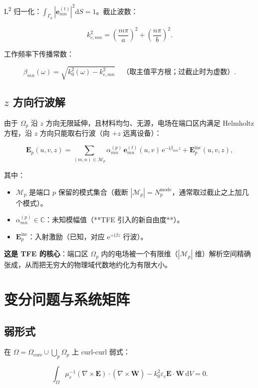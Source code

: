 \documentclass[11pt,a4paper]{ctexart}
\newcommand{\C}{\mathbb{C}}
\newcommand{\im}{\mathrm{i}}
\begin{document}
L\textsuperscript{2} 归一化：$\int_{\Gamma_p} |\bm e_{mn}^{(t)}|^2 \mathrm{d}S = 1$。截止波数：

\[
  k_{c, mn}^2 = \left(\frac{m\pi}{a}\right)^2 + \left(\frac{n\pi}{b}\right)^2.
\]

工作频率下传播常数：

\[
  \beta_{mn}(\omega) = \sqrt{k_0^2(\omega) - k_{c, mn}^2}
  \quad \text{（取主值平方根；过截止时为虚数）}.
\]

\subsection{\texorpdfstring{$z$ 方向行波解}{z 方向行波解}}

由于 $\Omega_p$ 沿 $z$ 方向无限延伸，且材料均匀、无源，电场在端口区内满足 Helmholtz 方程，沿 $z$ 方向只能取右行波（向 $+z$ 远离设备）：

\[
  \bm E_p(u, v, z) = \sum_{(m,n) \in \mathcal M_p}
    \alpha_{mn}^{(p)}\,\bm e_{mn}^{(t)}(u, v)\,\mathrm{e}^{-\im\beta_{mn} z}
    + \bm E_p^{\text{inc}}(u, v, z),
\]

其中：

\begin{itemize}
\item $\mathcal M_p$ 是端口 $p$ 保留的模式集合（截断 $|\mathcal M_p| = N_p^{\text{mode}}$，通常取过截止之上加几个模式）。
\item $\alpha_{mn}^{(p)} \in \C$：未知模幅值（**TFE 引入的新自由度**）。
\item $\bm E_p^{\text{inc}}$：入射激励（已知，对应 $\mathrm{e}^{+\im\beta z}$ 行波）。
\end{itemize}

\textbf{这是 TFE 的核心}：端口区 $\Omega_p$ 内的电场被一个有限维（$|\mathcal M_p|$ 维）解析空间精确张成，从而把无穷大的物理域代数地约化为有限大小。

\section{变分问题与系统矩阵}

\subsection{弱形式}

在 $\Omega = \Omega_{\text{core}} \cup \bigcup_p \Omega_p$ 上 curl-curl 弱式：

\[
  \int_\Omega \mu_r^{-1} (\nabla\times \bm E)\cdot(\nabla\times \overline{\bm W})
   - k_0^2 \varepsilon_c \bm E \cdot \overline{\bm W}\,\mathrm{d}V = 0.
\]
\end{document}
